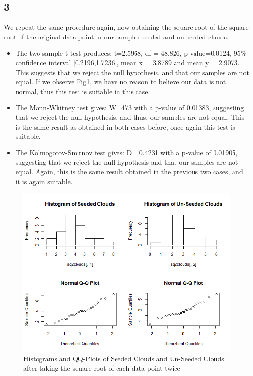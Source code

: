 \documentclass{article}
\begin{document}
    \subsection*{3}
    We repeat the same procedure again, now obtaining the square root of the square root of the original data point in our samples seeded and un-seeded clouds.
    \begin{itemize}
    \item The two sample t-test produces: t=2.5968, df = 48.826, p-value=0.0124, 95\% confidence interval [0.2196,1.7236], mean x = 3.8789 and mean y = 2.9073. This suggests that we reject the null hypothesis, and that our samples are not equal. If we observe Fig\ref{fig:sqsqclouds}, we have no reason to believe our data is not normal, thus this test is suitable in this case.
    \item The Mann-Whitney test gives: W=473 with a p-value of 0.01383, suggesting that we reject the null hypothesis, and thus, our samples are not equal. This is the same result as obtained in both cases before, once again this test is suitable.
    \item The Kolmogorov-Smirnov test gives: D= 0.4231 with a p-value of 0.01905, suggesting that we reject the null hypothesis and that our samples are not equal. Again, this is the same result obtained in the previous two cases, and it is again suitable.
    \end{itemize}
    
    \begin{figure}[H]
      \includegraphics[scale=0.5]{../results/2_3.png}
      \caption{Histograms and QQ-Plots of Seeded Clouds and Un-Seeded Clouds after taking the square root of each data point twice}
      \label{fig:sqsqclouds}
    \end{figure}
    
\end{document}
